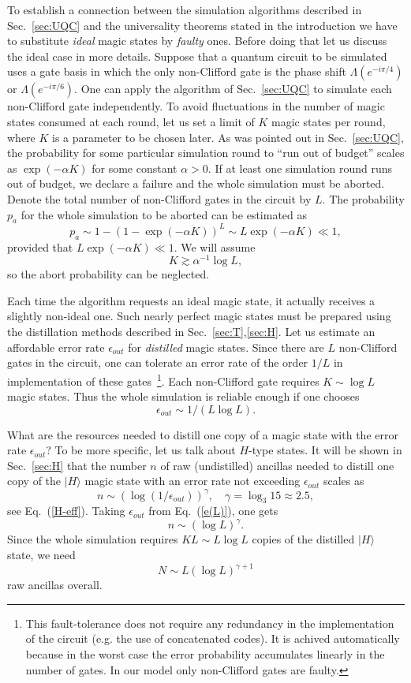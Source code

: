 \documentclass[pra,twocolumn,showpacs]{revtex4}
\newcommand{\ra}{\rangle}
\newcommand{\ep}{\epsilon}
\newcommand{\Hh}{$H$}
\begin{document}
To establish a connection between the simulation algorithms described in Sec.~\ref{sec:UQC}
and the universality  theorems  stated in the introduction we have to
substitute {\it ideal} magic states by {\it faulty} ones.
Before doing that let us discuss  the ideal case in more details.
Suppose that a quantum circuit to be simulated uses a gate basis in
which the only non-Clifford gate is the phase shift $\Lambda(e^{-i\pi/4})$
or $\Lambda(e^{-i\pi/6})$.
One can apply the algorithm of Sec.~\ref{sec:UQC} to simulate each
non-Clifford gate  independently. To avoid fluctuations in
the number of magic states consumed at each round, let us set
a limit of $K$ magic states per round,
where $K$ is a parameter to be chosen later.
As was pointed out in Sec.~\ref{sec:UQC},
the probability for some particular simulation round to ``run out of budget'' 
scales as $\exp{(-\alpha K)}$ for some constant $\alpha>0$. 
If at least one simulation round runs out of budget, we declare a failure and
the whole simulation must be aborted. 
Denote the total number of non-Clifford gates  in the circuit by $L$.
The probability $p_a$ for the whole  simulation to be aborted can be estimated as 
\[
p_a \sim 1- (1-\exp{(-\alpha K)})^L \sim L\exp{(-\alpha K)}\ll 1,
\]
provided that $L\exp{(-\alpha K)}\ll 1$. We will assume 
\[
K\gtrsim \alpha^{-1} \log{L},
\]
so the abort probability can be neglected.


Each time the algorithm requests an ideal magic state, it actually
receives a slightly non-ideal one. Such nearly
perfect magic states must be prepared  using the distillation methods
described in Sec.~\ref{sec:T},\ref{sec:H}. Let us estimate an
affordable error rate $\ep_{out}$ for {\it distilled} magic states. Since there are
$L$ non-Clifford gates in the circuit, one can tolerate 
an error rate of the order $1/L$ in implementation of these gates~\footnote{This
fault-tolerance does not require any redundancy in the implementation of the circuit
(e.g. the use of concatenated codes). It is achived automatically
because in the worst case the error probability accumulates linearly
in the number of gates.
In our model only non-Clifford gates are faulty.}.
Each non-Clifford gate requires $K\sim \log{L}$ magic states.
Thus the whole simulation is reliable enough if one chooses
\begin{equation}\label{e(L)}
\ep_{out}\sim 1/(L\log{L}).
\end{equation}

What are the resources needed to distill one copy of a magic state
with the error rate $\ep_{out}$? To be more specific, let us talk about
\Hh-type states. It will be shown in Sec.~\ref{sec:H} that the number $n$
of raw (undistilled) ancillas  needed to
distill one copy of the $|H\ra$ magic state with an error rate 
not exceeding $\ep_{out}$ scales as
\[
n\sim (\log{(1/\ep_{out})})^\gamma, \quad \gamma=\log_3{15}\approx 2.5,
\]
see Eq.~(\ref{H-eff}). Taking $\ep_{out}$ from Eq.~(\ref{e(L)}), one gets
\[
n\sim (\log{L})^\gamma.
\]
Since the whole simulation requires $KL\sim L\log{L}$ copies of the distilled 
$|H\ra$ state,
we need 
\[
N\sim L(\log{L})^{\gamma+1}
\]
raw ancillas overall. 
\end{document}

